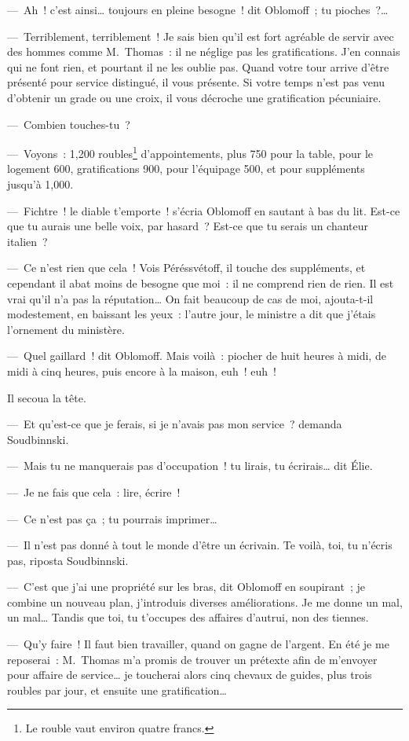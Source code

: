 \documentclass[french,twoside]{book} %
\begin{document}
— Ah ! c’est ainsi… toujours en pleine besogne ! dit Oblomoff ; tu pioches ?…\par
— Terriblement, terriblement ! Je sais bien qu’il est fort agréable de servir avec des hommes comme M. Thomas : il ne néglige pas les gratifications. J’en connais qui ne font rien, et pourtant il ne les oublie pas. Quand votre tour arrive d’être présenté pour service distingué, il vous présente. Si votre temps n’est pas venu d’obtenir un grade ou une croix, il vous décroche une gratification pécuniaire.\par
— Combien touches-tu ?\par
— Voyons : 1,200 roubles\footnote{Le rouble vaut environ quatre francs.} d’appointements, plus 750 pour la table, pour le logement 600, gratifications 900, pour l’équipage 500, et pour suppléments jusqu’à 1,000.\par
— Fichtre ! le diable t’emporte ! s’écria Oblomoff en sautant à bas du lit. Est-ce que tu aurais une belle voix, par hasard ? Est-ce que tu serais un chanteur italien ?\par
— Ce n’est rien que cela ! Vois Péréssvétoff, il touche des suppléments, et cependant il abat moins de besogne que moi : il ne comprend rien de rien. Il est vrai qu’il n’a pas la réputation… On fait beaucoup de cas de moi, ajouta-t-il modestement, en baissant les yeux : l’autre jour, le ministre a dit que j’étais l’ornement du ministère.\par
— Quel gaillard ! dit Oblomoff. Mais voilà : piocher de huit heures à midi, de midi à cinq heures, puis encore à la maison, euh ! euh !\par
Il secoua la tête.\par
— Et qu’est-ce que je ferais, si je n’avais pas mon service ? demanda Soudbinnski.\par
— Mais tu ne manquerais pas d’occupation ! tu lirais, tu écrirais… dit Élie.\par
— Je ne fais que cela : lire, écrire !\par
— Ce n’est pas ça ; tu pourrais imprimer…\par
— Il n’est pas donné à tout le monde d’être un écrivain. Te voilà, toi, tu n’écris pas, riposta Soudbinnski.\par
— C’est que j’ai une propriété sur les bras, dit Oblomoff en soupirant ; je combine un nouveau plan, j’introduis diverses améliorations. Je me donne un mal, un mal… Tandis que toi, tu t’occupes des affaires d’autrui, non des tiennes.\par
— Qu’y faire ! Il faut bien travailler, quand on gagne de l’argent. En été je me reposerai : M. Thomas m’a promis de trouver un prétexte afin de m’envoyer pour affaire de service… je toucherai alors cinq chevaux de guides, plus trois roubles par jour, et ensuite une gratification…\par
\end{document}
